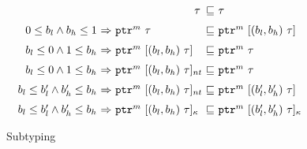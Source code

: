 \documentclass[conference]{IEEEtran}
\newenvironment{DIFnomarkup}{}{}
\newcommand{\tarray}[3]{\tarrayb{({#1},{#2})}{#3}}
\newcommand{\tarrayb}[2]{\ensuremath{[{#1}~{#2}]}}
\newcommand{\tntarray}[3]{\tntarrayb{({#1},{#2})}{#3}}
\newcommand{\tntarrayb}[2]{\tarrayb{#1}{#2}_{nt}}
\newcommand{\tallarrayb}[2]{\ensuremath{[{#1}~{#2}]_{\kappa}}}
\newcommand{\tallarray}[3]{\tallarrayb{({#1},{#2})}{#3}}
\newcommand{\tptr}[2]{\ensuremath{\mathtt{ptr}^{#2}~{#1}}}
\newcommand{\tarrayptr}[4]{{\tptr{\tarray{#1}{#2}{#3}}{#4}}}
\newcommand{\tntarrayptr}[4]{{\tptr{\tntarray{#1}{#2}{#3}}{#4}}}
\newcommand{\tallarrayptr}[4]{{\tptr{\tallarray{#1}{#2}{#3}}{#4}}}
\providecommand{\DIFaddbegin}{} %
\providecommand{\DIFaddend}{} %
\providecommand{\DIFdelbegin}{} %
\providecommand{\DIFdelend}{} %
\newcommand{\DIFscaledelfig}{0.5}
\newlength{\DIFdelgraphicswidth} %
\newlength{\DIFdelgraphicsheight} %
\newcommand{\DIFaddincludegraphics}[2][]{{\color{blue}\fbox{\DIFOincludegraphics[#1]{#2}}}} %
\newcommand{\DIFdelincludegraphics}[2][]{%
\sbox{\DIFdelgraphicsbox}{\DIFOincludegraphics[#1]{#2}}%
\settoboxwidth{\DIFdelgraphicswidth}{\DIFdelgraphicsbox} %
\settoboxtotalheight{\DIFdelgraphicsheight}{\DIFdelgraphicsbox} %
\scalebox{\DIFscaledelfig}{%
\parbox[b]{\DIFdelgraphicswidth}{\usebox{\DIFdelgraphicsbox}\\[-\baselineskip] \rule{\DIFdelgraphicswidth}{0em}}\llap{\resizebox{\DIFdelgraphicswidth}{\DIFdelgraphicsheight}{%
\setlength{\unitlength}{\DIFdelgraphicswidth}%
\begin{picture}(1,1)%
\thicklines\linethickness{2pt} %
{\color[rgb]{1,0,0}\put(0,0){\framebox(1,1){}}}%
{\color[rgb]{1,0,0}\put(0,0){\line( 1,1){1}}}%
{\color[rgb]{1,0,0}\put(0,1){\line(1,-1){1}}}%
\end{picture}%
}\hspace*{3pt}}} %
} %
\DeclareRobustCommand{\DIFaddbegin}{\DIFOaddbegin \let\includegraphics\DIFaddincludegraphics} %
\DeclareRobustCommand{\DIFaddend}{\DIFOaddend \let\includegraphics\DIFOincludegraphics} %
\DeclareRobustCommand{\DIFdelbegin}{\DIFOdelbegin \let\includegraphics\DIFdelincludegraphics} %
\DeclareRobustCommand{\DIFdelend}{\DIFOaddend \let\includegraphics\DIFOincludegraphics} %
\begin{document}
\DIFdelbegin %
\DIFdelend \DIFaddbegin \begin{DIFnomarkup}
\begin{figure}
{\small
\begin{center}
\mbox{%
$\begin{array}{r@{~}c@{~}l@{~}c@{~}l}
    &&\multicolumn{1}{r}{\tau} &\sqsubseteq& \tau\\[0.6em]
    0\le b_l \wedge b_h \le 1 &\Rightarrow& \tptr{\tau}{m}&\sqsubseteq& \tarrayptr{b_l}{b_h}{\tau}{m}\\[0.6em]
    b_l \le 0 \wedge 1 \le b_h &\Rightarrow& \tarrayptr{b_l}{b_h}{\tau}{m} &\sqsubseteq& \tptr{\tau}{m}\\[0.6em]
    b_l \le 0 \wedge 1 \le b_h &\Rightarrow& \tntarrayptr{b_l}{b_h}{\tau}{m} &\sqsubseteq& \tptr{\tau}{m}\\[0.6em]
b_l \le b_l' \wedge b_h' \le b_h &\Rightarrow& \tntarrayptr{b_l}{b_h}{\tau}{m} &\sqsubseteq& \tarrayptr{b_l'}{b_h'}{\tau}{m}\\[0.6em]
    b_l \le b_l' \wedge b_h' \le b_h &\Rightarrow& \tallarrayptr{b_l}{b_h}{\tau}{m} &\sqsubseteq& \tallarrayptr{b_l'}{b_h'}{\tau}{m}
    \end{array}
  $
}%
\end{center}
}
  \caption{Subtyping}
  \label{fig:checkc-subtype}
\end{figure}
\end{DIFnomarkup}
\DIFaddend 
\end{document}
